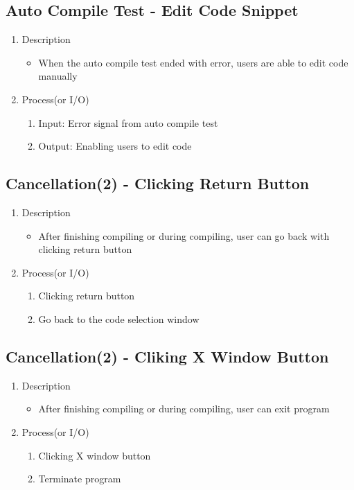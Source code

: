 \documentclass[conference]{IEEEtran}
\begin{document}
\textit{}

\subsection{Auto Compile Test - Edit Code Snippet}
\begin{enumerate}
  \item Description
  \begin{itemize}
    \item When the auto compile test ended with error, users are able to edit code manually
  \end{itemize}
  \item Process(or I/O)
  \begin{enumerate}
    \item Input: Error signal from auto compile test
    \item Output: Enabling users to edit code
  \end{enumerate}
\end{enumerate}


\textit{}


\subsection{Cancellation(2) - Clicking Return Button}
\begin{enumerate}
  \item Description
  \begin{itemize}
    \item After finishing compiling or during compiling, user can go back with clicking return button
  \end{itemize}
  \item Process(or I/O)
  \begin{enumerate}
    \item Clicking return button
    \item Go back to the code selection window
  \end{enumerate}
\end{enumerate}
\textit{}


\subsection{Cancellation(2) - Cliking X Window Button}
\begin{enumerate}
  \item Description
  \begin{itemize}
    \item After finishing compiling or during compiling, user can exit program
  \end{itemize}
  \item Process(or I/O)
  \begin{enumerate}
    \item Clicking X window button
    \item Terminate program
  \end{enumerate}
\end{enumerate}
\textit{}
\end{document}
